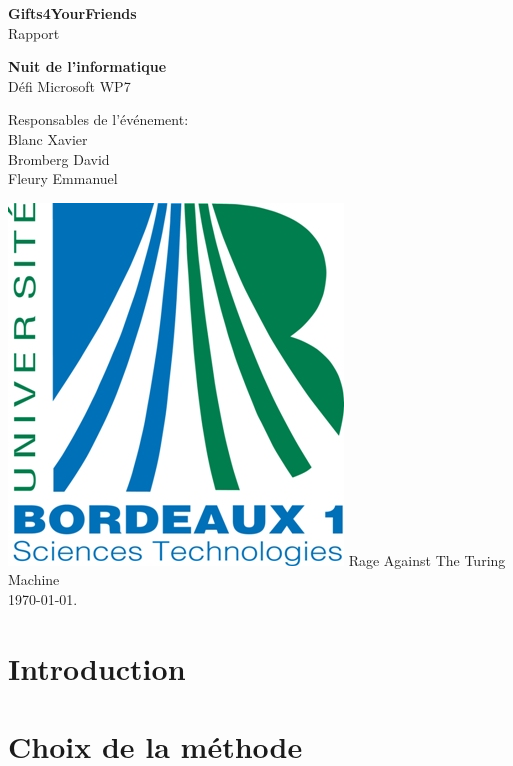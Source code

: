 \documentclass[a4paper,francais,titlepage]{report}
\begin{document}
\pagestyle{fancy}

\begin{titlepage}
 \begin{center}
	\vspace*{3.5cm}
	\Large \textbf{Gifts4YourFriends} \\
	\vspace{0.2cm}
	\small Rapport
	\vspace{2cm}

	\huge \textbf{Nuit de l'informatique} \\
	\vspace{0.3cm}
	\large {Défi Microsoft WP7}
	\vspace{1.5cm}
 \end{center}
 
 \begin{flushleft}
	\normalsize {\hspace{6cm}Responsables de l'événement: \\ 
				 \hspace{7.0cm} Blanc Xavier \\
				 \hspace{6.7cm} Bromberg David \\
				 \hspace{6.6cm} Fleury Emmanuel}
	\vspace{2cm}
 \end{flushleft}
 
   \begin{center}
   \includegraphics[scale=0.3]{logo_bx1.jpg}
   	\vfill 
   	\vspace{2cm}
	\normalsize {Rage Against The Turing Machine\\}
	\vspace{1.5cm} 
	{\today}.
 \end{center}
\end{titlepage}

\section{Introduction}

\section{Choix de la méthode}
\end{document}

